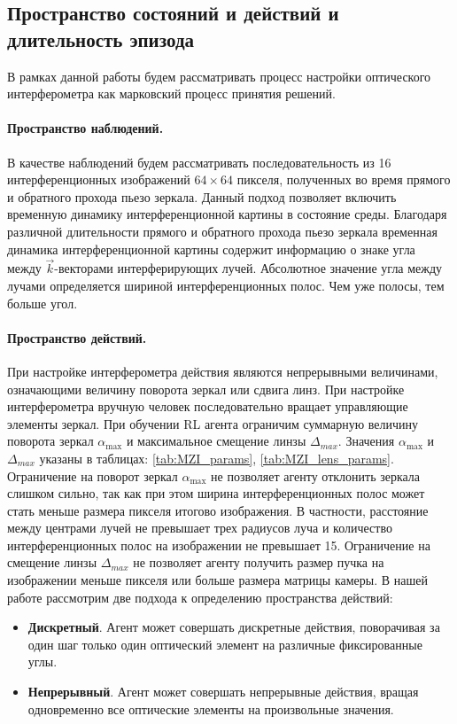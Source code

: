 \subsection{Пространство состояний и действий и длительность эпизода}

В рамках данной работы будем рассматривать процесс настройки оптического интерферометра как марковский процесс принятия решений. 

\paragraph{Пространство наблюдений.}
В качестве наблюдений будем рассматривать последовательность из 16 интерференционных изображений $64\times64$ пикселя, полученных во время прямого и обратного прохода пьезо зеркала. Данный подход позволяет включить временную динамику интерференционной картины в состояние среды. Благодаря различной длительности прямого и обратного прохода пьезо зеркала временная динамика интерференционной картины содержит информацию о знаке угла между $\vec{k}$-векторами интерферирующих лучей. Абсолютное значение угла между лучами определяется шириной интерференционных полос. Чем уже полосы, тем больше угол.

\paragraph{Пространство действий.}
При настройке интерферометра действия являются непрерывными величинами, означающими величину поворота зеркал или сдвига линз. При настройке интерферометра вручную человек последовательно вращает управляющие элементы зеркал. При обучении RL агента ограничим суммарную величину поворота зеркал $\alpha_{\max}$ и максимальное смещение линзы $\Delta_{max}$. Значения $\alpha_{\max}$ и $\Delta_{max}$ указаны в таблицах: \ref{tab:MZI_params}, \ref{tab:MZI_lens_params}. Ограничение на поворот зеркал $\alpha_{\max}$ не позволяет агенту отклонить зеркала слишком сильно, так как при этом ширина интерференционных полос может стать меньше размера пикселя итогово изображения. В частности, расстояние между центрами лучей не превышает трех радиусов луча и количество интерференционных полос на изображении не превышает 15. Ограничение на смещение линзы $\Delta_{max}$ не позволяет агенту получить размер пучка на изображении меньше пикселя или больше размера матрицы камеры. В нашей работе рассмотрим две подхода к определению пространства действий:

\begin{itemize}
    \item \textbf{Дискретный}. Агент может совершать дискретные действия, поворачивая за один шаг только один оптический элемент на различные фиксированные углы.
    \item \textbf{Непрерывный}. Агент может совершать непрерывные действия, вращая одновременно все оптические элементы на произвольные значения.
\end{itemize}

